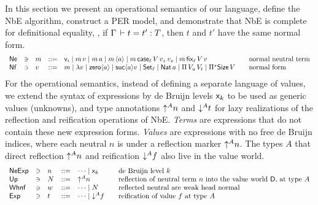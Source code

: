 \documentclass[acmlarge,review,anonymous]{acmart}\settopmatter{printfolios=true}
\begin{document}
In this section we present an operational semantics of our language,
define the NbE algorithm, construct a PER model, and demonstrate that
NbE is complete for definitional equality, \ie, if
$\Gamma \,\vdash t = t' : T$, then $t$ and $t'$ have the same normal form.
\[
\begin{array}{lllll@{\qquad}l}
  \Ne & \ni &
  m & ::= & \ind i \mid m\,v \mid m\,a \mid m\,\ann a \mid
            m\,\case[\ell] V{v_z}{v_s} \mid m\,\fix[\ell] V v
    & \mbox{normal neutral term} \\
  \Nf & \ni &
  v & ::= & m \mid \lambda v \mid \zero a \mid \suc a v \mid
            \Set[\ell] \mid \Nat a \mid \piT {V_u}{V_t} \mid
            \epiT\Size V
    & \mbox{normal form} \\
\end{array}
\]
For the operational semantics,
instead of defining a separate language of values,
we extend the syntax of expressions by de Bruijn levels $\mathsf{x}_{k}$
to be used as generic values (unknowns), and type annotations
$\mathord{\uparrow^{A}} n$ and $\mathord{\downarrow^{A}} t$ for lazy realizations of the
reflection and reification operations of NbE.
\emph{Terms} are expressions that do not contain these new expression
forms. \emph{Values}  are expressions with no free de Bruijn
indices, where each neutral $n$ is under a reflection marker $\mathord{\uparrow^{A}} n$.
The types $A$ that direct reflection $\mathord{\uparrow^{A}} n$ and reification
$\mathord{\downarrow^{A}} f$ also live in the value world.
\[
\begin{array}{lllrl@{\qquad}l}
  \NeExp & \ni & n & ::= & \dots \mid \lev k
    & \mbox{de Bruijn level $k$} \\
  \tUp  & \ni & N & ::= & \up A n
     & \mbox{reflection of neutral term $n$ into the value world $\D$, at
       type $A$} \\
  \Whnf & \ni & w & ::= & \dots \mid N
    & \mbox{reflected neutral are weak head normal} \\
  \Exp  & \ni & t & ::= & \dots \mid \down A f
     & \mbox{reification of value $f$ at type $A$} \\
\end{array}
\]
\end{document}
